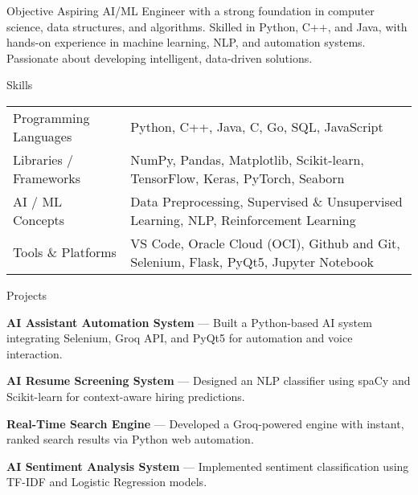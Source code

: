 \documentclass[10pt]{resume}
\begin{document}

\begin{rSection}{Objective}
Aspiring AI/ML Engineer with a strong foundation in computer science, data structures, and algorithms. Skilled in Python, C++, and Java, with hands-on experience in machine learning, NLP, and automation systems. Passionate about developing intelligent, data-driven solutions.
\end{rSection}


\begin{rSection}{Skills}

\begin{tabular}{@{}p{2in}p{5in}}
Programming Languages & Python, C++, Java, C, Go, SQL, JavaScript \\[3pt]
Libraries / Frameworks& NumPy, Pandas, Matplotlib, Scikit-learn, TensorFlow, Keras, PyTorch, Seaborn \\[3pt]
AI / ML Concepts & Data Preprocessing, Supervised \& Unsupervised Learning, NLP, Reinforcement Learning \\[3pt]
Tools \& Platforms & VS Code, Oracle Cloud (OCI), Github and Git, Selenium, Flask, PyQt5, Jupyter Notebook\\
\end{tabular}

\end{rSection}


\begin{rSection}{Projects}

\item \textbf{AI Assistant Automation System} — Built a Python-based AI system integrating Selenium, Groq API, and PyQt5 for automation and voice interaction.

\item \textbf{AI Resume Screening System} — Designed an NLP classifier using spaCy and Scikit-learn for context-aware hiring predictions.

\item \textbf{Real-Time Search Engine} — Developed a Groq-powered engine with instant, ranked search results via Python web automation.

\item \textbf{AI Sentiment Analysis System} — Implemented sentiment classification using TF-IDF and Logistic Regression models.

\end{rSection}
\end{document}
